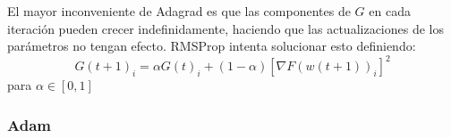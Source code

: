 El mayor inconveniente de Adagrad es que las componentes de $G$ en cada iteración pueden crecer indefinidamente, haciendo que las actualizaciones de los parámetros no tengan efecto. RMSProp intenta solucionar esto definiendo:
$$ G(t+1)_{i} = \alpha G(t)_{i} + (1-\alpha) [ \nabla F(w(t+1))_{i} ]^2 $$ 
para $\alpha \in [0,1]$

\subsubsection{Adam}




